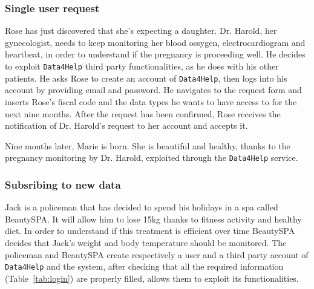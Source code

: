 
    \subsubsection{Single user request}

      Rose has just discovered that she's expecting a daughter. Dr. Harold, her gynecologist, needs to keep monitoring her blood ossygen, electrocardiogram and heartbeat, in order to understand if the pregnancy is proceeding well. He decides to exploit \texttt{Data4Help} third party functionalities, as he does with his other patients. He asks Rose to create an account of \texttt{Data4Help}, then logs into his account by providing email and password. He navigates to the request form and inserts Rose's fiscal code and the data types he wants to have access to for the next nine months. After the request has been confirmed, Rose receives the notification of Dr. Harold's request to her account and accepts it.

      Nine months later, Marie is born. She is beautiful and healthy, thanks to the pregnancy monitoring by Dr. Harold, exploited through the \texttt{Data4Help} service.


    \subsubsection{Subsribing to new data}

      Jack is a policeman that has decided to spend his holidays in a spa called BeautySPA. It will allow him to lose 15kg thanks to fitness activity and healthy diet. In order to understand if this treatment is efficient over time BeautySPA decides that Jack's weight and body temperature should be monitored. The policeman and BeautySPA create respectively a user and a third party account of \texttt{Data4Help} and the system, after checking that all the required information (Table~\ref{tab:login}) are properly filled, allows them to exploit its functionalities.

